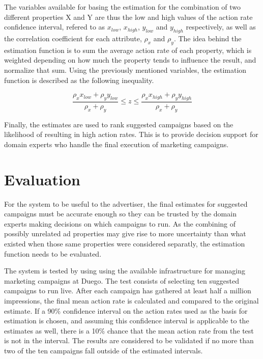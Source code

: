 \documentclass[11pt,a4paper]{report}
\begin{document}
The variables available for basing the estimation for the combination of two different properties X and Y are thus the low and high values of the action rate confidence interval, refered to as \(x_{low}\), \(x_{high}\), \(y_{low}\) and \(y_{high}\) respectively, as well as the correlation coefficient for each attribute, \(\rho_x\) and \(\rho_y\). The idea behind the estimation function is to sum the average action rate of each property, which is weighted depending on how much the property tends to influence the result, and normalize that sum. Using the previously mentioned variables, the estimation function is described as the following inequality.

\begin{equation}
	\frac{\rho_x x_{low} + \rho_y y_{low}}{\rho_x + \rho_y} \leq z \leq \frac{\rho_x x_{high} + \rho_y y_{high}}{\rho_x + \rho_y}
\end{equation}

Finally, the estimates are used to rank suggested campaigns based on the likelihood of resulting in high action rates. This is to provide decision support for domain experts who handle the final execution of marketing campaigns.

\section{Evaluation}
For the system to be useful to the advertiser, the final estimates for suggested campaigns must be accurate enough so they can be trusted by the domain experts making decisions on which campaigns to run. As the combining of possibly unrelated ad properties may give rise to more uncertainty than what existed when those same properties were considered separatly, the estimation function needs to be evaluated.

The system is tested by using using the available infrastructure for managing marketing campaigns at Duego. The test consists of selecting ten suggested campaigns to run live. After each campaign has gathered at least half a million impressions, the final mean action rate is calculated and compared to the original estimate. If a 90\% confidence interval on the action rates used as the basis for estimation is chosen, and assuming this confidence interval is applicable to the estimates as well, there is a 10\% chance that the mean action rate from the test is not in the interval. The results are considered to be validated if no more than two of the ten campaigns fall outside of the estimated intervals.
\end{document}
